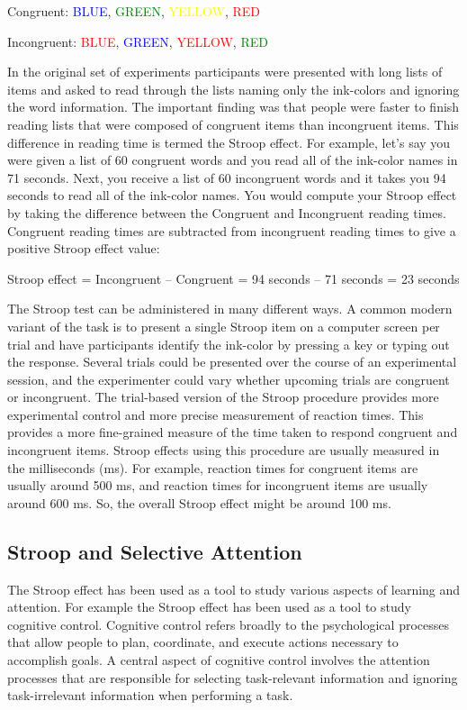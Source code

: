 Congruent: 	\textcolor{blue}{BLUE}, \textcolor{green}{GREEN}, \textcolor{yellow}{YELLOW}, \textcolor{red}{RED}

Incongruent:	\textcolor{red}{BLUE}, \textcolor{blue}{GREEN}, \textcolor{red}{YELLOW}, \textcolor{green}{RED} 

In the original set of experiments participants were presented with long lists of items and asked to read through the lists naming only the ink-colors and ignoring the word information. The important finding was that people were faster to finish reading lists that were composed of congruent items than incongruent items. This difference in reading time is termed the Stroop effect. For example, let’s say you were given a list of 60 congruent words and you read all of the ink-color names in 71 seconds. Next, you receive a list of 60 incongruent words and it takes you 94 seconds to read all of the ink-color names. You would compute your Stroop effect by taking the difference between the Congruent and Incongruent reading times. Congruent reading times are subtracted from incongruent reading times to give a positive Stroop effect value:

Stroop effect = Incongruent – Congruent  = 94 seconds – 71 seconds =  23 seconds

The Stroop test can be administered in many different ways. A common modern variant of the task is to present a single Stroop item on a computer screen per trial and have participants identify the ink-color by pressing a key or typing out the response. Several trials could be presented over the course of an experimental session, and the experimenter could vary whether upcoming trials are congruent or incongruent. The trial-based version of the Stroop procedure provides more experimental control and more precise measurement of reaction times.  This provides a more fine-grained measure of the time taken to respond congruent and incongruent items. Stroop effects using this procedure are usually measured in the milliseconds (ms). For example, reaction times for congruent items are usually around 500 ms, and reaction times for incongruent items are usually around 600 ms. So, the overall Stroop effect might be around 100 ms. 

\subsection{Stroop and Selective Attention}

The Stroop effect has been used as a tool to study various aspects of learning and attention. For example the Stroop effect has been used as a tool to study cognitive control. Cognitive control refers broadly to the psychological processes that allow people to plan, coordinate, and execute actions necessary to accomplish goals. A central aspect of cognitive control involves the attention processes that are responsible for selecting task-relevant information and ignoring task-irrelevant information when performing a task. 

